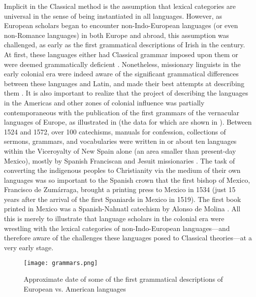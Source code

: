 Implicit in the Classical method is the assumption that lexical categories are universal in the sense of being instantiated in all languages. However, as European scholars began to encounter non-Indo-European languages (or even non-Romance languages) in both Europe and abroad, this assumption was challenged, as early as the first grammatical descriptions of Irish in the  century. At first, these languages either had Classical grammar imposed upon them or were deemed grammatically deficient \parencite[3]{Suarez1983}. Nonetheless, missionary linguists in the early colonial era were indeed aware of the significant grammatical differences between these languages and Latin, and made their best attempts at describing them \parencite[3--4]{Suarez1983}. It is also important to realize that the project of describing the languages in the Americas and other zones of colonial influence was partially contemporaneous with the publication of the first grammars of the vernacular languages of Europe, as illustrated in  (the data for which are shown in ). Between 1524 and 1572, over 100 catechisms, manuals for confession, collections of sermons, grammars, and vocabularies were written in or about ten languages within the Viceroyalty of New Spain alone (an area smaller than present-day Mexico), mostly by Spanish Franciscan and Jesuit missionaries \parencite[2]{Suarez1983}. The task of converting the indigenous peoples to Christianity via the medium of their own languages was so important to the Spanish crown that the first bishop of Mexico, Francisco de Zumárraga, brought a printing press to Mexico in 1534 (just 15 years after the arrival of the first Spaniards in Mexico in 1519). The first book printed in Mexico was a Spanish-Nahuatl catechism by Alonso de Molina \parencite[2]{Suarez1983}. All this is merely to illustrate that language scholars in the colonial era were wrestling with the lexical categories of non-Indo-European languages—and therefore aware of the challenges these languages posed to Classical theories—at a very early stage.

\begin{figure}
  \texttt{[image: grammars.png]}
  \caption{Approximate date of some of the first grammatical descriptions of European vs. American languages}
  \label{fig:grammars}
\end{figure}

\singlespacing
\setlength\LTleft{0pt}
\setlength\LTright{0pt}
\renewcommand{\arraystretch}{1.5}

